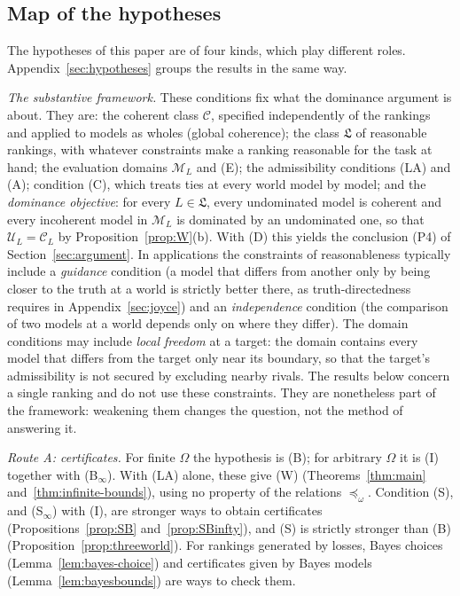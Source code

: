 \documentclass[11pt]{article}
\theoremstyle{definition}
\theoremstyle{remark}
\newcommand{\M}{\mathcal M}
\newcommand{\C}{\mathcal C}
\newcommand{\U}{\mathcal U}
\begin{document}
\subsection{Map of the hypotheses}\label{sec:map}
The hypotheses of this paper are of four kinds, which play different roles. Appendix~\ref{sec:hypotheses} groups the results in the same way.

\emph{The substantive framework.} These conditions fix what the dominance argument is about. They are: the coherent class $\C$, specified independently of the rankings and applied to models as wholes (global coherence); the class $\mathfrak L$ of reasonable rankings, with whatever constraints make a ranking reasonable for the task at hand; the evaluation domains $\M_L$ and (E); the admissibility conditions (LA) and (A); condition (C), which treats ties at every world model by model; and the \emph{dominance objective}: for every $L\in\mathfrak L$, every undominated model is coherent and every incoherent model in $\M_L$ is dominated by an undominated one, so that $\U_L=\C_L$ by Proposition~\ref{prop:W}(b). With (D) this yields the conclusion (P4) of Section~\ref{sec:argument}. In applications the constraints of reasonableness typically include a \emph{guidance} condition (a model that differs from another only by being closer to the truth at a world is strictly better there, as truth-directedness requires in Appendix~\ref{sec:joyce}) and an \emph{independence} condition (the comparison of two models at a world depends only on where they differ). The domain conditions may include \emph{local freedom} at a target: the domain contains every model that differs from the target only near its boundary, so that the target's admissibility is not secured by excluding nearby rivals. The results below concern a single ranking and do not use these constraints. They are nonetheless part of the framework: weakening them changes the question, not the method of answering it.

\emph{Route A: certificates.} For finite $\Omega$ the hypothesis is (B); for arbitrary $\Omega$ it is (I) together with (B$_\infty$). With (LA) alone, these give (W) (Theorems~\ref{thm:main} and~\ref{thm:infinite-bounds}), using no property of the relations $\preceq_\omega$. Condition (S), and (S$_\infty$) with (I), are stronger ways to obtain certificates (Propositions~\ref{prop:SB} and~\ref{prop:SBinfty}), and (S) is strictly stronger than (B) (Proposition~\ref{prop:threeworld}). For rankings generated by losses, Bayes choices (Lemma~\ref{lem:bayes-choice}) and certificates given by Bayes models (Lemma~\ref{lem:bayesbounds}) are ways to check them.
\end{document}
